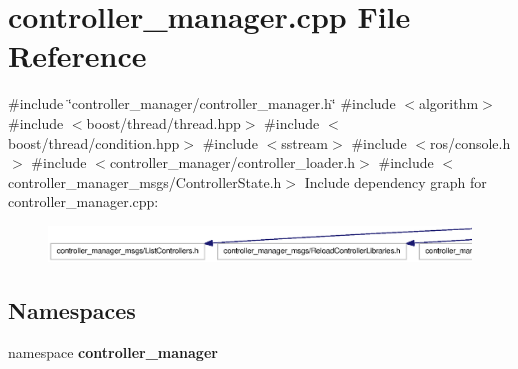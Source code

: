 \section{controller\-\_\-manager.\-cpp \-File \-Reference}
\label{controller__manager_8cpp}
{\ttfamily \#include \char`\"{}controller\-\_\-manager/controller\-\_\-manager.\-h\char`\"{}}\*
{\ttfamily \#include $<$algorithm$>$}\*
{\ttfamily \#include $<$boost/thread/thread.\-hpp$>$}\*
{\ttfamily \#include $<$boost/thread/condition.\-hpp$>$}\*
{\ttfamily \#include $<$sstream$>$}\*
{\ttfamily \#include $<$ros/console.\-h$>$}\*
{\ttfamily \#include $<$controller\-\_\-manager/controller\-\_\-loader.\-h$>$}\*
{\ttfamily \#include $<$controller\-\_\-manager\-\_\-msgs/\-Controller\-State.\-h$>$}\*
\-Include dependency graph for controller\-\_\-manager.\-cpp\-:
\nopagebreak
\begin{figure}[H]
\begin{center}
\leavevmode
\includegraphics[width=350pt]{controller__manager_8cpp__incl}
\end{center}
\end{figure}
\subsection*{\-Namespaces}
\begin{DoxyCompactItemize}
\item 
namespace {\bf controller\-\_\-manager}
\end{DoxyCompactItemize}
